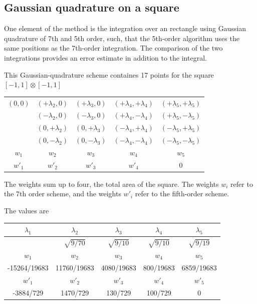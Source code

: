 \documentclass[11pt,a4paper]{report}
\begin{document}
\subsection{Gaussian quadrature on a square}
One element of the method is the integration over an rectangle using
Gaussian quadrature of 7th and 5th order, such, that the 5th-order
algorithm uses the same positions as the 7th-order integration. The
comparison of the two integrations provides an error estimate in
addition to the integral.

This Gaussian-quadrature scheme containes 17 points for the
square\cite{genz80_jcomputapplmath6_295} $[-1,1]\otimes[-1,1]$
\begin{center}
\begin{tabular}{|c|c|c|c|c|}
\hline
$(0,0)$&$(+\lambda_2,0) $&$(+\lambda_3,0) $&$(+\lambda_4,+\lambda_4) $&$(+\lambda_5,+\lambda_5)$ \\
      &$(-\lambda_2,0) $&$(-\lambda_3,0) $&$(+\lambda_4,-\lambda_4) $&$(+\lambda_5,-\lambda_5)$ \\
      &$(0,+\lambda_2) $&$(0,+\lambda_3) $&$(-\lambda_4,+\lambda_4) $&$(-\lambda_5,+\lambda_5)$ \\
      &$(0,-\lambda_2) $&$(0,-\lambda_3) $&$(-\lambda_4,-\lambda_4) $&$(-\lambda_5,-\lambda_5)$ \\
\hline
$w_1   $&$ w_2           $&$    w_3        $&$     w_4                $&$     w_5$ \\
\hline
$w'_1   $&$ w'_2           $&$    w'_3        $&$     w'_4                $&$0$ \\
\hline
\end{tabular}
\end{center}
The weights sum up to four, the total area of the square. The weights
$w_i$ refer to the 7th order scheme, and the weights $w'_i$ refer to
the fifth-order scheme. 

The values are
\begin{center}
\begin{tabular}{|c|c|c|c|c|}
\hline
$\lambda_1$ &$\lambda_2$ &$\lambda_3$ &$\lambda_4$ &$\lambda_5$ \\
\hline
            &$\sqrt{9/70}$ &$\sqrt{9/10}$ &$\sqrt{9/10}$ &$\sqrt{9/19}$ \\
\hline
\hline
$w_1$ &$w_2$ &$w_3$ &$w_4$ &$w_5$ \\
\hline
-15264/19683 & 11760/19683 & 4080/19683 &800/19683 & 6859/19683\\
\hline
\hline
$w'_1$ &$w'_2$ &$w'_3$ &$w'_4$ &$w'_5$ \\
\hline
-3884/729 & 1470/729 & 130/729 & 100/729 & 0\\
\hline
\end{tabular}
\end{center}
\end{document}
